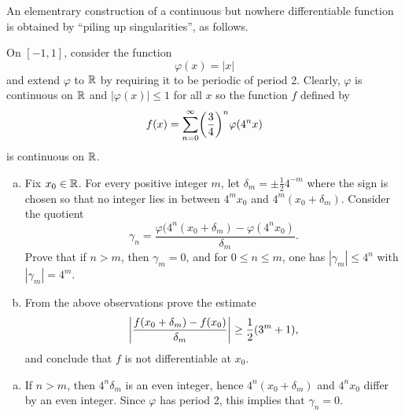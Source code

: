 \begin{pb}[4]
    An elementrary construction of a continuous but nowhere differentiable function
    is obtained by ``piling up singularities'', as follows.

    On \([-1, 1]\), consider the function
    \begin{equation*}
        \varphi(x) = |x|
    \end{equation*}
    and extend \(\varphi\) to \(\mathbb{R}\) by requiring it to be periodic of period 2.
    Clearly, \(\varphi\) is continuous on \(\mathbb{R}\) and \(|\varphi(x)| \leq 1\) for all \(x\)
    so the function \(f\) defined by
    \begin{equation*}
        f(x) = \sum_{n = 0}^{\infty} \lrb{\frac{3}{4}}^n \varphi(4^nx)
    \end{equation*}
    is continuous on \(\mathbb{R}\).
    
    \begin{enumerate}[(a)]
    \item
        Fix \(x_0 \in \mathbb{R}\).
        For every positive integer \(m\), let \(\delta_m = \pm \frac{1}{2} 4^{-m}\)
        where the sign is chosen so that no integer lies in between \(4^m x_0\) and \(4^m(x_0 + \delta_m)\).
        Consider the quotient
        \begin{equation*}
            \gamma_n = \frac{\varphi(4^n(x_0 + \delta_m) - \varphi(4^n x_0)}{\delta_m}.
        \end{equation*}
        Prove that if \(n > m\), then \(\gamma_m = 0\),
        and for \(0 \leq n \leq m\), one has \(|\gamma_m| \leq 4^n\) with \(|\gamma_m| = 4^m\).
    
    \item
        From the above observations prove the estimate
        \begin{equation*}
            \abs{\frac{f(x_0 + \delta_m) - f(x_0)}{\delta_m}} \geq \frac{1}{2} (3^m + 1),
        \end{equation*}
        and conclude that \(f\) is not differentiable at \(x_0\).

    \end{enumerate}

\begin{soln}
    \begin{enumerate}[(a)]
    \item
        If \(n > m\), then \(4^n \delta_m\) is an even integer,
        hence \(4^n(x_0 + \delta_m)\) and \(4^n x_0\) differ
        by an even integer.
        Since \(\varphi\) has period 2, this implies that \(\gamma_n = 0\).


\end{enumerate}
\end{soln}
\end{pb}
